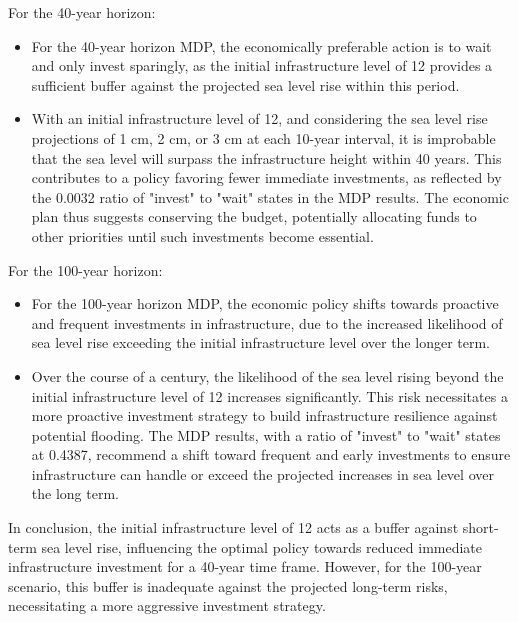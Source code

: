 \begin{answer}

For the 40-year horizon:
\begin{itemize}
    \item For the 40-year horizon MDP, the economically preferable action is to wait and only invest sparingly, as the initial infrastructure level of 12 provides a sufficient buffer against the projected sea level rise within this period.
    \item With an initial infrastructure level of 12, and considering the sea level rise projections of 1 cm, 2 cm, or 3 cm at each 10-year interval, it is improbable that the sea level will surpass the infrastructure height within 40 years. This contributes to a policy favoring fewer immediate investments, as reflected by the 0.0032 ratio of "invest" to "wait" states in the MDP results. The economic plan thus suggests conserving the budget, potentially allocating funds to other priorities until such investments become essential.
\end{itemize}

For the 100-year horizon:
\begin{itemize}
    \item For the 100-year horizon MDP, the economic policy shifts towards proactive and frequent investments in infrastructure, due to the increased likelihood of sea level rise exceeding the initial infrastructure level over the longer term.
    \item Over the course of a century, the likelihood of the sea level rising beyond the initial infrastructure level of 12 increases significantly. This risk necessitates a more proactive investment strategy to build infrastructure resilience against potential flooding. The MDP results, with a ratio of "invest" to "wait" states at 0.4387, recommend a shift toward frequent and early investments to ensure infrastructure can handle or exceed the projected increases in sea level over the long term.
\end{itemize}

In conclusion, the initial infrastructure level of 12 acts as a buffer against short-term sea level rise, influencing the optimal policy towards reduced immediate infrastructure investment for a 40-year time frame. However, for the 100-year scenario, this buffer is inadequate against the projected long-term risks, necessitating a more aggressive investment strategy.


\end{answer}
\clearpage

